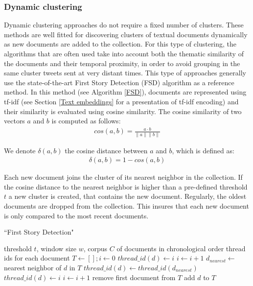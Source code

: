 	\subsubsection{Dynamic clustering \label{Subsubsec: incremental clustering}} Dynamic clustering approaches do not require a fixed number of clusters. These methods are well fitted for discovering clusters of textual documents dynamically as new documents are added to the collection. For this type of clustering, the algorithms that are often used take into account both the thematic similarity of the documents and their temporal proximity, in order to avoid grouping in the same cluster tweets sent at very distant times. This type of approaches generally use the state-of-the-art First Story Detection (FSD) \citep{allan_introduction_2002} algorithm as a reference method. In this method (see Algorithm \ref{FSD}), documents are represented using tf-idf (see Section \ref{Text embeddings} for a presentation of tf-idf encoding) and their similarity is evaluated using cosine similarity. The cosine similarity of two vectors $a$ and $b$  is computed as follows:
	\begin{align}
    cos(a, b) = \frac{a \cdot b}{\| a\|\| b\|}
	\end{align}
	
	We denote $\delta(a,b)$ the cosine distance between $a$ and $b$, which is defined as:
	\begin{align}
	    \delta(a,b) = 1 - cos(a, b)
	\end{align}
	
	Each new document joins the cluster of its nearest neighbor in the collection. If the cosine distance to the nearest neighbor is higher than a pre-defined threshold $t$ a new cluster is created, that contains the new document. Regularly, the oldest documents are dropped from the collection. This insures that each new document is only compared to the most recent documents. 

\begin{algorithm}
\caption{``First Story Detection"}
\label{FSD}
\begin{algorithmic}[1]
\REQUIRE threshold $t$, window size $w$, corpus $C$ of documents in chronological order
\ENSURE thread ids for each document
\STATE $T \leftarrow \left[ \right] ; i \leftarrow 0 $
\STATE $thread\_id(d) \leftarrow i$
\STATE $i \leftarrow i+1$
\ELSE
\STATE $d_{nearest} \leftarrow $ nearest neighbor of $d$ in $T$
\STATE $thread\_id(d) \leftarrow thread\_id(d_{nearest})$
\ELSE
\STATE $thread\_id(d) \leftarrow i$
\STATE $i \leftarrow i+1$
\ENDIF
\ENDIF
{}
\STATE remove first document from $T$
\ENDIF
\STATE add $d$ to $T$
\ENDWHILE
\end{algorithmic}
\end{algorithm}




